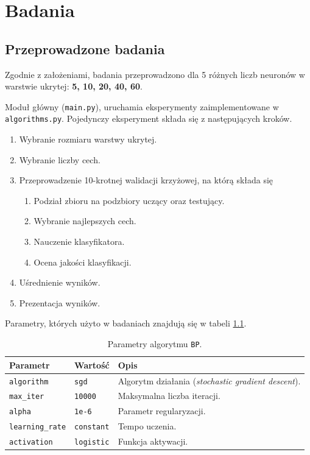 \chapter{Badania}

\section{Przeprowadzone badania}

Zgodnie z założeniami, badania przeprowadzono dla 5 różnych liczb neuronów w warstwie ukrytej: \textbf{5, 10, 20, 40, 60}.

Moduł główny (\texttt{main.py}), uruchamia eksperymenty zaimplementowane w \texttt{algorithms.py}.
Pojedynczy eksperyment składa się z następujących kroków.
\begin{enumerate}
	\item{Wybranie rozmiaru warstwy ukrytej.}
	\item{Wybranie liczby cech.}
	\item{Przeprowadzenie 10-krotnej walidacji krzyżowej, na którą składa się}
	\begin{enumerate}
		\item{Podział zbioru na podzbiory uczący oraz testujący.}
		\item{Wybranie najlepszych cech.}
		\item{Nauczenie klasyfikatora.}
		\item{Ocena jakości klasyfikacji.}
	\end{enumerate}
	\item{Uśrednienie wyników.}
	\item{Prezentacja wyników.}
\end{enumerate}

Parametry, których użyto w badaniach znajdują się w tabeli \ref{tab:params}.

\begin{table}[h!]
    \centering
    \caption{Parametry algorytmu \texttt{BP}.}
    \label{tab:params}
    \begin{tabular}{p{3cm}p{2cm}p{11cm}}
        \toprule
        \textbf{Parametr} & \textbf{Wartość} & \textbf{Opis} \\
        \midrule
        \texttt{algorithm} & \texttt{sgd} & Algorytm działania (\textit{stochastic gradient descent}). \\
        \texttt{max\_iter} & \texttt{10000} & Maksymalna liczba iteracji. \\
        \texttt{alpha} & \texttt{1e-6} & Parametr regularyzacji. \\
        \texttt{learning\_rate} & \texttt{constant} & Tempo uczenia. \\
        \texttt{activation} & \texttt{logistic} & Funkcja aktywacji. \\
        \bottomrule
    \end{tabular}
\end{table}

